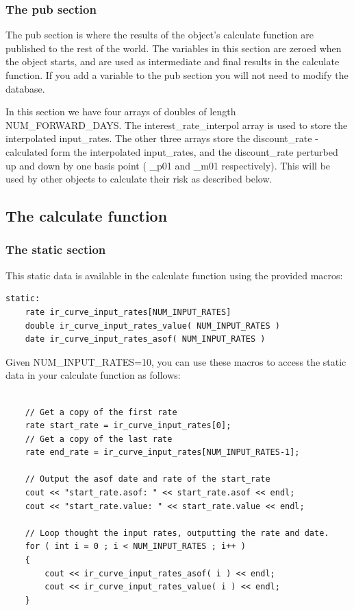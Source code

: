 \documentclass{report}
\begin{document}
\subsubsection{The pub section}

The pub section is where the results of the object's calculate function are published to the rest of the world. The variables in this section are zeroed when the object starts, and are used as intermediate and final results in the calculate function. If you add a variable to the pub section you will not need to modify the database.

In this section we have four arrays of doubles of length NUM_FORWARD_DAYS. The interest_rate_interpol array is used to store the interpolated input_rates. The other three arrays store the discount_rate - calculated form the interpolated input_rates, and the discount_rate perturbed up and down by one basis point ( _p01 and _m01 respectively). This will be used by other objects to calculate their risk as described below.

\subsection{The calculate function}

\subsubsection{The static section}

This static data is available in the calculate function using the provided macros:

\begin{verbatim}
static:
    rate ir_curve_input_rates[NUM_INPUT_RATES]
    double ir_curve_input_rates_value( NUM_INPUT_RATES )
    date ir_curve_input_rates_asof( NUM_INPUT_RATES )
\end{verbatim}

Given NUM_INPUT_RATES=10, you can use these macros to access the static data in your calculate function as follows:

\begin{verbatim}

    // Get a copy of the first rate
    rate start_rate = ir_curve_input_rates[0];
    // Get a copy of the last rate
    rate end_rate = ir_curve_input_rates[NUM_INPUT_RATES-1];

    // Output the asof date and rate of the start_rate
    cout << "start_rate.asof: " << start_rate.asof << endl;
    cout << "start_rate.value: " << start_rate.value << endl;

    // Loop thought the input rates, outputting the rate and date.
    for ( int i = 0 ; i < NUM_INPUT_RATES ; i++ )
    {
        cout << ir_curve_input_rates_asof( i ) << endl;
        cout << ir_curve_input_rates_value( i ) << endl;
    }

\end{verbatim}
\end{document}

